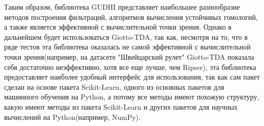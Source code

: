 Таким образом, библиотека GUDHI представляет наибольшее разнообразие методов построения фильтраций, алгоритмов вычисления устойчивых гомологий, а также является эффективной с вычислительной точки зрения. Однако в дальнейшем будет использоваться Giotto-TDA, так как, несмотря на то, что в ряде тестов эта библиотека оказалась не самой эффективной с вычислительной точки зрения(например, на датасете "Швейцарский рулет" Giotto-TDA показала себя достаточно неэффективно, хотя все еще лучше, чем Ripser), эта библиотека предоставляет наиболее удобный интерфейс для использования, так как сам пакет сделан на основе пакета Scikit-Learn, одного из основных пакетов для машинного обучения на Python, а потому все методы имеют похожую структуру, какую имеют методы из пакета Scikit-Learn и других пакетов для научных вычислений на Python(например, NumPy).
